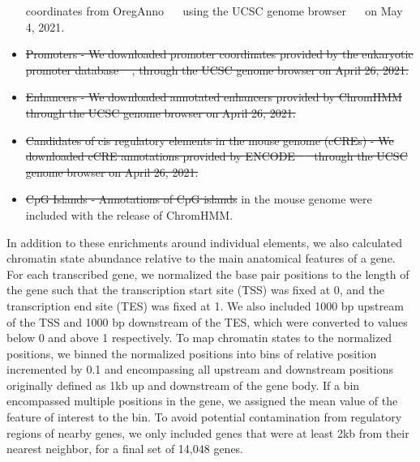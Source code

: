 \documentclass[
  11pt,
]{article}
\providecommand{\DIFaddtex}[1]{{\protect\color{blue}\uwave{#1}}} %
\providecommand{\DIFdeltex}[1]{{\protect\color{red}\sout{#1}}}                      %
\providecommand{\DIFaddbegin}{} %
\providecommand{\DIFaddend}{} %
\providecommand{\DIFdelend}{} %
\providecommand{\DIFadd}[1]{\texorpdfstring{\DIFaddtex{#1}}{#1}} %
\providecommand{\DIFdel}[1]{\texorpdfstring{\DIFdeltex{#1}}{}} %
\newcommand{\DIFaddincludegraphics}[2][]{{\color{blue}\fbox{\DIFOincludegraphics[#1]{#2}}}} %
\DeclareRobustCommand{\DIFaddbegin}{\DIFOaddbegin \let\includegraphics\DIFaddincludegraphics} %
\DeclareRobustCommand{\DIFaddend}{\DIFOaddend \let\includegraphics\DIFOincludegraphics} %
\DeclareRobustCommand{\DIFdelend}{\DIFOaddend \let\includegraphics\DIFOincludegraphics} %
\begin{document}
\begin{itemize}
{  coordinates from OregAnno \mbox{%
\citep{pmid26578589} }\hspace{0pt}%
using the UCSC genome
  browser \mbox{%
\citep{pmid12045153} }\hspace{0pt}%
on May 4, 2021.
}%
\item%
\DIFdel{Promoters - We downloaded promoter coordinates provided by the
  eukaryotic promoter database \mbox{%
\citep{pmid27899657, pmid27899657}}\hspace{0pt}%
,
  through the UCSC genome browser on April 26, 2021.
}%
\item%
\DIFdel{Enhancers - We downloaded annotated enhancers provided by ChromHMM
  through the UCSC genome browser on April 26, 2021.
}%
\item%
\DIFdel{Candidates of cis regulatory elements in the mouse genome (cCREs) - We
  downloaded cCRE annotations provided by ENCODE
  \mbox{%
\citep{pmid22955616, pmid32728249} }\hspace{0pt}%
through the UCSC genome browser on
  April 26, 2021.
}%
\item%
\DIFdel{CpG Islands - Annotations of CpG islands }\DIFdelend \DIFaddbegin \DIFadd{Annotations of intergenic regions }\DIFaddend in the mouse genome
  were included with the release of ChromHMM.
\end{itemize}

In addition to these enrichments around individual elements, we also
calculated chromatin state abundance relative to the main anatomical
features of a gene. For each transcribed gene, we normalized the base
pair positions to the length of the gene such that the transcription
start site (TSS) was fixed at 0, and the transcription end site (TES)
was fixed at 1. We also included 1000 bp upstream of the TSS and 1000 bp
downstream of the TES, which were converted to values below 0 and above
1 respectively. To map chromatin states to the normalized positions, we
binned the normalized positions into bins of relative position
incremented by 0.1 and encompassing all upstream and downstream
positions originally defined as 1kb up and downstream of the gene body.
If a bin encompassed multiple positions in the gene, we assigned the
mean value of the feature of interest to the bin. To avoid potential
contamination from regulatory regions of nearby genes, we only included
genes that were at least 2kb from their nearest neighbor, for a final
set of 14,048 genes.
\end{document}
